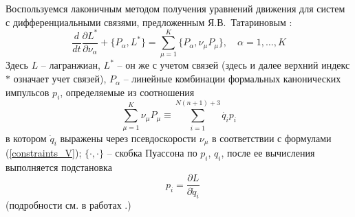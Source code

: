 

Воспользуемся лаконичным методом получения уравнений движения для систем с дифференциальными связями, предложенным Я.В.~Татариновым \cite{Tatarinov}:
\begin{equation}\label{Tatarinov}
    \frac{d}{dt}\frac{\partial L^{*}}{\partial \nu_\alpha}  + \{P_\alpha, L^{*}\} = \sum\limits_{\mu = 1}^{K}\{P_\alpha, \nu_\mu P_\mu\},\quad \alpha = 1,\dots, K
\end{equation}
Здесь $L$ -- лагранжиан, $L^*$ -- он же с учетом связей (здесь и далее верхний индекс $*$ означает учет связей), $P_\alpha$ -- линейные комбинации формальных канонических импульсов $p_i$, определяемые из соотношения 
$$\sum\limits_{\mu=1}^{K}\nu_\mu P_\mu \equiv \sum\limits_{i=1}^{N(n+1)+3}\dot{q_i} p_i$$
 в котором $\dot{q}_i$ выражены через псевдоскорости $\nu_\mu$ в соответствии с формулами (\ref{constraints_V}); $\{\cdot, \cdot\}$ -- скобка Пуассона по $p_i$, $q_i$, после ее вычисления выполняется подстановка 
$$\hspace{10pt} p_i = \frac{\partial L}{\partial \dot{q}_i}$$
(подробности см. в работах \cite{Tatarinov,Zobova2011}.)

